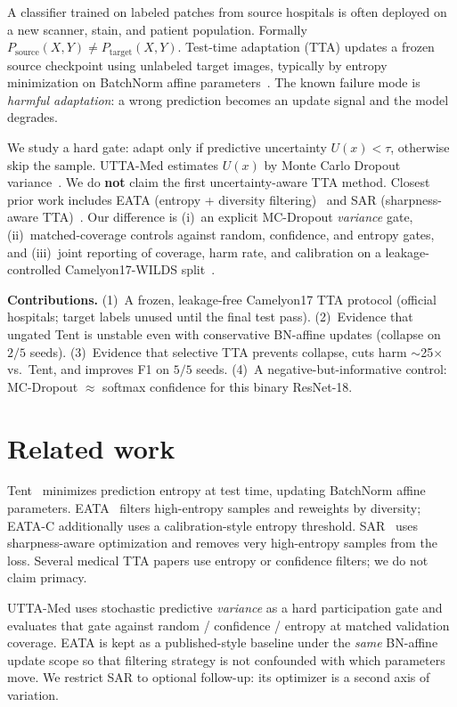 \documentclass[conference]{IEEEtran}
\begin{document}
A classifier trained on labeled patches from source hospitals is often deployed on a new scanner, stain, and patient population.
Formally $P_{\mathrm{source}}(X,Y)\neq P_{\mathrm{target}}(X,Y)$.
Test-time adaptation (TTA) updates a frozen source checkpoint using unlabeled target images, typically by entropy minimization on BatchNorm affine parameters~\cite{wang2021tent}.
The known failure mode is \emph{harmful adaptation}: a wrong prediction becomes an update signal and the model degrades.

We study a hard gate: adapt only if predictive uncertainty $U(x)<\tau$, otherwise skip the sample.
UTTA-Med estimates $U(x)$ by Monte Carlo Dropout variance~\cite{gal2016dropout}.
We do \textbf{not} claim the first uncertainty-aware TTA method.
Closest prior work includes EATA (entropy + diversity filtering)~\cite{niu2022eata} and SAR (sharpness-aware TTA)~\cite{niu2023sar}.
Our difference is (i)~an explicit MC-Dropout \emph{variance} gate, (ii)~matched-coverage controls against random, confidence, and entropy gates, and (iii)~joint reporting of coverage, harm rate, and calibration on a leakage-controlled Camelyon17-WILDS split~\cite{koh2021wilds,bandi2018camelyon17}.

\textbf{Contributions.}
(1)~A frozen, leakage-free Camelyon17 TTA protocol (official hospitals; target labels unused until the final test pass).
(2)~Evidence that ungated Tent is unstable even with conservative BN-affine updates (collapse on $2/5$ seeds).
(3)~Evidence that selective TTA prevents collapse, cuts harm $\sim$25$\times$ vs.\ Tent, and improves F1 on $5/5$ seeds.
(4)~A negative-but-informative control: MC-Dropout $\approx$ softmax confidence for this binary ResNet-18.

\section{Related work}

Tent~\cite{wang2021tent} minimizes prediction entropy at test time, updating BatchNorm affine parameters.
EATA~\cite{niu2022eata} filters high-entropy samples and reweights by diversity; EATA-C additionally uses a calibration-style entropy threshold.
SAR~\cite{niu2023sar} uses sharpness-aware optimization and removes very high-entropy samples from the loss.
Several medical TTA papers use entropy or confidence filters; we do not claim primacy.

UTTA-Med uses stochastic predictive \emph{variance} as a hard participation gate and evaluates that gate against random / confidence / entropy at matched validation coverage.
EATA is kept as a published-style baseline under the \emph{same} BN-affine update scope so that filtering strategy is not confounded with which parameters move.
We restrict SAR to optional follow-up: its optimizer is a second axis of variation.
\end{document}
